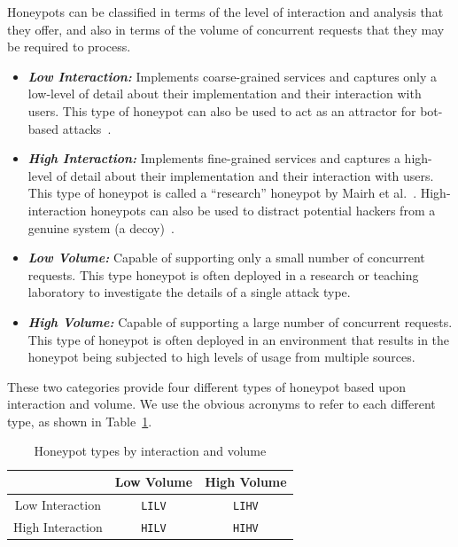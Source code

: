 \documentclass{llncs}
\begin{document}
Honeypots can be classified in terms of the level of interaction and
analysis that they offer, and also in terms of the volume of concurrent requests
that they may be required to process.

\begin{itemize}

  \item \noindent \emph{\textbf{Low Interaction:}} Implements coarse-grained
    services and captures only a low-level of detail about their implementation
    and their interaction with users.  This type of honeypot can also be used
    to act as an attractor for bot-based attacks~\cite{SZB:16}.  

  \item \noindent \emph{\textbf{High Interaction:}} Implements fine-grained
    services and captures a high-level of detail about their implementation and
    their interaction with users.  This type of honeypot is called a
    ``research'' honeypot by Mairh et al.~\cite{MBVJ:11}. High-interaction
    honeypots can also be used to distract potential hackers from a genuine
    system (a decoy)~\cite{M:06,SNKA:12}.

\end{itemize}


\begin{itemize}

  \item \noindent \emph{\textbf{Low Volume:}} Capable of supporting only a
    small number of concurrent requests.  This type honeypot is often deployed
    in a research or teaching laboratory to investigate the details of a single
    attack type.

  \item \noindent \emph{\textbf{High Volume:}} Capable of supporting a large
    number of concurrent requests. This type of honeypot is often deployed in
    an environment that results in the honeypot being subjected to high levels
    of usage from multiple sources. 

\end{itemize}

These two categories provide four different types of honeypot based upon
interaction and volume. We use the obvious acronyms to refer to each different
type, as shown in Table~\ref{table:HoneypotTypes}.

\begin{table}[h]
\caption{Honeypot types by interaction and volume\label{table:HoneypotTypes}}
\begin{center}
\begin{tabular}{| c | c| c |}
\hline
 & Low Volume & High Volume \\
\hline
Low Interaction & \texttt{LILV} & \texttt{LIHV} \\
\hline
High Interaction & \texttt{HILV} & \texttt{HIHV} \\
\hline
\end{tabular}
\end{center}
\end{table}
\end{document}
